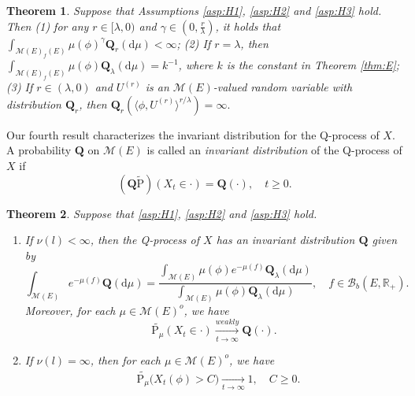 \documentclass[12pt,a4paper]{amsart}
\numberwithin{equation}{section}
\theoremstyle{plain}
\newtheorem{thm}{Theorem}[section]
\theoremstyle{definition}
\theoremstyle{remark}
\begin{document}
\begin{thm}\label{thm:L}
	Suppose that Assumptions \eqref{asp:H1}, \eqref{asp:H2} and \eqref{asp:H3} hold.
	Then (1)
	for any $r\in [\lambda, 0)$ and $\gamma \in (0, \frac{r}{\lambda})$, it holds that $\int_{{\mathcal M(E)}_f(E)}\mu(\phi)^\gamma\mathbf Q_r({\mathrm d}\mu)<\infty$;
	(2) 
	If $r=\lambda$,
	then $\int_{{\mathcal M(E)}_f(E)}\mu(\phi)\mathbf Q_\lambda({\mathrm d}\mu) = k^{-1}$, where $k$ is  the constant in Theorem \ref{thm:E};
	(3) 
	If $r\in (\lambda, 0)$
	and $U^{(r)}$ is an $\mathcal M(E)$-valued random variable with distribution $ \mathbf Q_r$, then $ \mathbf Q_r(\langle\phi, U^{(r)}\rangle^{r/\lambda})=\infty.$
\end{thm}

	Our fourth result characterizes the invariant distribution for the Q-process of $X$.
	A probability $\mathbf Q$ on $\mathcal M(E)$ is called an \emph{invariant distribution} of the Q-process of $X$ if
\[
	(\mathbf Q\widetilde{\mathrm P})(X_t \in \cdot )
	=\mathbf Q(\cdot),	\quad t\geq 0.
\]

\begin{thm}\label{thm:I}
	Suppose that \eqref{asp:H1}, \eqref{asp:H2} and \eqref{asp:H3} hold.
\begin{enumerate}
\item
	If $\nu(l)<\infty$, then the Q-process of $X$ has an invariant distribution $\mathbf Q$ given by
\[
	\int_{\mathcal M(E)} e^{-\mu(f)}\mathbf Q(\mathrm d\mu)
	=\frac{\int_{\mathcal M(E)}\mu(\phi)e^{-\mu(f)}\mathbf Q_\lambda({\mathrm d}\mu)} {\int_{\mathcal M(E)}\mu(\phi)\mathbf Q_\lambda({\mathrm d}\mu)}, \quad f\in \mathcal B_b(E, \mathbb R_+).
\]	
Moreover, for each $\mu\in\mathcal M(E)^o$, we have
\[
	\widetilde{\mathrm P_\mu}(X_t \in \cdot )
	\xrightarrow[t\to \infty]{weakly} {\mathbf Q}(\cdot).
\]
\item
	If $\nu(l) = \infty$, then for each $\mu \in \mathcal M(E)^o$, we have
\begin{align}
	& \widetilde{\mathrm P_\mu}\big(X_t(\phi) > C\big)
	\xrightarrow[t\to \infty]{} 1, \quad C\geq 0.
\end{align}
\end{enumerate}
\end{thm}
\end{document}
